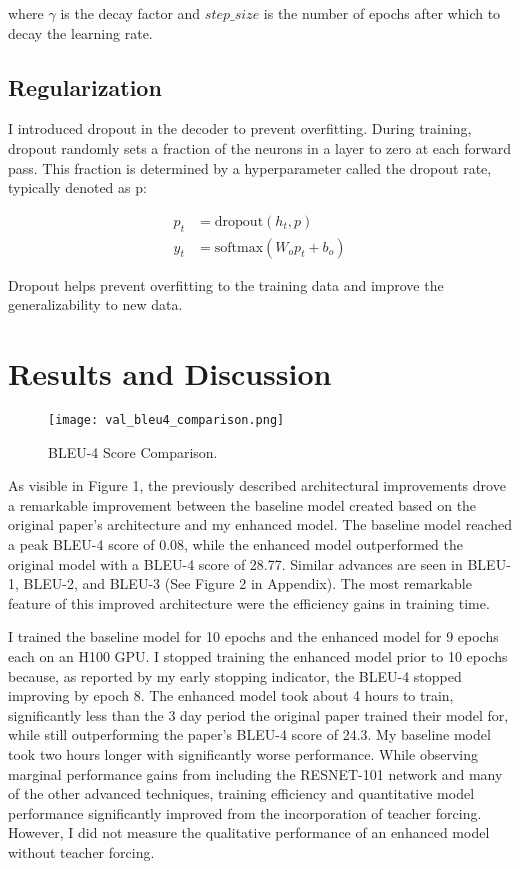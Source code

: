 \documentclass{article}
\theoremstyle{plain}
\theoremstyle{definition}
\theoremstyle{remark}
\begin{document}
where $\gamma$ is the decay factor and $step\_size$ is the number of epochs after which to decay the learning rate.

\subsection{Regularization} I introduced dropout in the decoder to prevent overfitting. During training, dropout randomly sets a fraction of the neurons in a layer to zero at each forward pass. This fraction is determined by a hyperparameter called the dropout rate, typically denoted as p:
    
\begin{align}
p_t &= \text{dropout}(h_t, p) \\
y_t &= \text{softmax}(W_o p_t + b_o)
\end{align}

Dropout helps prevent overfitting to the training data and improve the generalizability to new data. 


\section{Results and Discussion}

\begin{figure}[htbp]
    \centering
    \texttt{[image: val\_bleu4\_comparison.png]}
    \caption{BLEU-4 Score Comparison.}
    \label{fig:example}
\end{figure}

As visible in Figure 1, the previously described architectural improvements drove a remarkable improvement between the baseline model created based on the original paper's architecture and my enhanced model. The baseline model reached a peak BLEU-4 score of 0.08, while the enhanced model outperformed the original model with a BLEU-4 score of 28.77. Similar advances are seen in BLEU-1, BLEU-2, and BLEU-3 (See Figure 2 in Appendix). The most remarkable feature of this improved architecture were the efficiency gains in training time.

I trained the baseline model for 10 epochs and the enhanced model for 9 epochs each on an H100 GPU. I stopped training the enhanced model prior to 10 epochs because, as reported by my early stopping indicator, the BLEU-4 stopped improving by epoch 8. The enhanced model took about 4 hours to train, significantly less than the 3 day period the original paper trained their model for, while still outperforming the paper's BLEU-4 score of 24.3. My baseline model took two hours longer with significantly worse performance. While observing marginal performance gains from including the RESNET-101 network and many of the other advanced techniques, training efficiency and quantitative model performance significantly improved from the incorporation of teacher forcing. However, I did not measure the qualitative performance of an enhanced model without teacher forcing.
\end{document}
